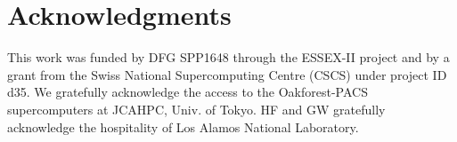 \documentclass[letterpaper]{llncs}
\newcommand{\OFP}{Oakforest-PACS\xspace}
\newcommand{\GHcomment}[1]{{\color{red}{ #1 }\color{black}}}
\begin{document}
\section*{Acknowledgments} 

This work was funded by DFG SPP1648 through the ESSEX-II project and
by a grant from the Swiss National Supercomputing Centre (CSCS) under
project ID d35. We gratefully acknowledge the access to the \OFP
supercomputers at JCAHPC, Univ. of Tokyo.
HF and GW gratefully
acknowledge the hospitality of Los Alamos National Laboratory.






\end{document}
